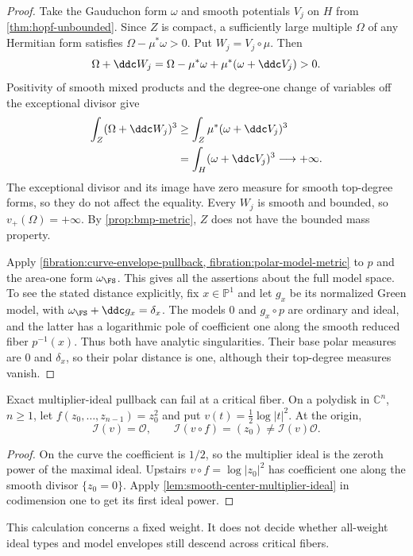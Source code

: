 \begin{proof}
Take the Gauduchon form $\omega$ and smooth potentials $V_j$ on
$H$ from \cref{thm:hopf-unbounded}. Since $Z$ is compact, a
sufficiently large multiple $\Omega$ of any Hermitian form satisfies
$\Omega-\mu^*\omega>0$. Put $W_j=V_j\circ\mu$. Then
\[
 \Omega+\ddc W_j
 =\Omega-\mu^*\omega+\mu^*(\omega+\ddc V_j)>0.
\]
Positivity of smooth mixed products and the degree-one change
of variables off the exceptional divisor give
\[
 \begin{aligned}
 \int_Z(\Omega+\ddc W_j)^3
 &\geq\int_Z\mu^*(\omega+\ddc V_j)^3\\
 &=\int_H(\omega+\ddc V_j)^3\longrightarrow+\infty.
 \end{aligned}
\]
The exceptional divisor and its image have zero measure for
smooth top-degree forms, so they do not affect the equality.
Every $W_j$ is smooth and bounded, so $v_+(\Omega)=+\infty$.
By \cref{prop:bmp-metric}, $Z$ does not have the bounded mass
property.

Apply \cref{fibration:curve-envelope-pullback,
fibration:polar-model-metric} to $p$ and the area-one form
$\omega_{\FS}$. This gives all the assertions about the full
model space. To see the stated distance explicitly, fix
$x\in\mathbb P^1$ and let $g_x$ be its normalized Green model,
with $\omega_{\FS}+\ddc g_x=\delta_x$. The models $0$ and
$g_x\circ p$ are ordinary and ideal, and the latter has a
logarithmic pole of coefficient one along the smooth reduced
fiber $p^{-1}(x)$. Thus both have analytic singularities. Their
base polar measures are $0$ and $\delta_x$, so their polar
distance is one, although their top-degree measures vanish.
\end{proof}

\begin{example}\label{fibration:ramified-ideal-pullback}
Exact multiplier-ideal pullback can fail at a critical fiber.
On a polydisk in $\mathbb C^n$, $n\geq1$, let
$f(z_0,\ldots,z_{n-1})=z_0^2$ and put
$v(t)=\tfrac12\log|t|^2$. At the origin,
\[
 \mathcal I(v)=\mathcal O,\qquad
 \mathcal I(v\circ f)=(z_0)
             \ne\mathcal I(v)\mathcal O.
\]
\end{example}
\begin{proof}
On the curve the coefficient is $1/2$, so the multiplier ideal
is the zeroth power of the maximal ideal. Upstairs
$v\circ f=\log|z_0|^2$ has coefficient one along the smooth
divisor $\{z_0=0\}$. Apply \cref{lem:smooth-center-multiplier-ideal}
in codimension one to get its first ideal power.
\end{proof}

This calculation concerns a fixed weight. It does not decide
whether all-weight ideal types and model envelopes still descend
across critical fibers.

